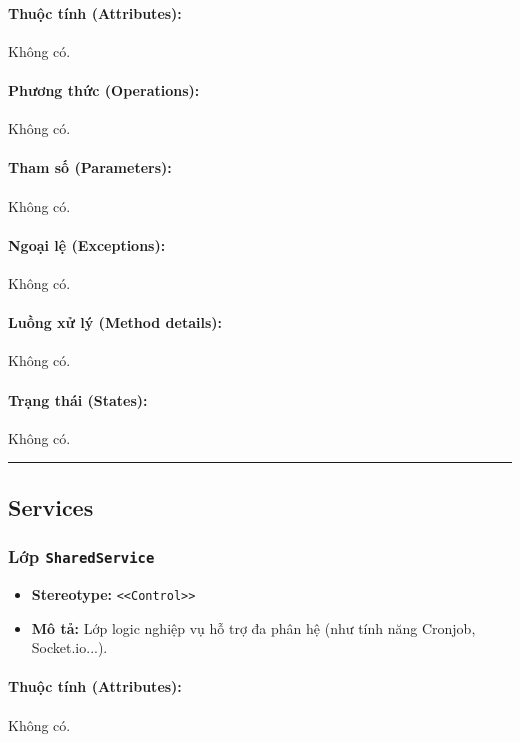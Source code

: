 \documentclass[12pt,a4paper]{article}
\begin{document}
\paragraph{Thuộc tính (Attributes):}
Không có.

\paragraph{Phương thức (Operations):}
Không có.

\paragraph{Tham số (Parameters):}
Không có.

\paragraph{Ngoại lệ (Exceptions):}
Không có.

\paragraph{Luồng xử lý (Method details):}
Không có.

\paragraph{Trạng thái (States):}
Không có.

\vskip 0.5cm
\noindent\rule{\textwidth}{0.5pt}
\vskip 0.5cm

\subsection{Services}

\subsubsection{Lớp \texttt{SharedService}}
\begin{itemize}[leftmargin=*]
    \item \textbf{Stereotype:} \texttt{\textless{}\textless{}Control\textgreater{}\textgreater{}}
    \item \textbf{Mô tả:} Lớp logic nghiệp vụ hỗ trợ đa phân hệ (như tính năng Cronjob, Socket.io...).
\end{itemize}

\paragraph{Thuộc tính (Attributes):}
Không có.
\end{document}
